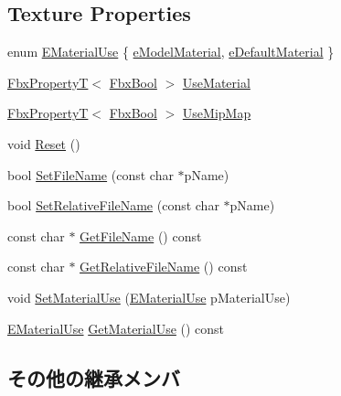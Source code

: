 \subsection*{Texture Properties}
\begin{DoxyCompactItemize}
\item 
enum \hyperlink{class_fbx_file_texture_ae85eb429015d450d8cb8a753634c0d1e}{E\+Material\+Use} \{ \hyperlink{class_fbx_file_texture_ae85eb429015d450d8cb8a753634c0d1ea0819de314e6f6458e1bc017c536e0821}{e\+Model\+Material}, 
\hyperlink{class_fbx_file_texture_ae85eb429015d450d8cb8a753634c0d1ea494e44ff611551c1172d7c9783690caa}{e\+Default\+Material}
 \}
\item 
\hyperlink{class_fbx_property_t}{Fbx\+PropertyT}$<$ \hyperlink{fbxtypes_8h_a92e0562b2fe33e76a242f498b362262e}{Fbx\+Bool} $>$ \hyperlink{class_fbx_file_texture_a404cc00d81d3645071cb475b0b822c59}{Use\+Material}
\item 
\hyperlink{class_fbx_property_t}{Fbx\+PropertyT}$<$ \hyperlink{fbxtypes_8h_a92e0562b2fe33e76a242f498b362262e}{Fbx\+Bool} $>$ \hyperlink{class_fbx_file_texture_ab7dd18dfbaf20ce668f5443ac7b5d2ec}{Use\+Mip\+Map}
\item 
void \hyperlink{class_fbx_file_texture_acc5d7a39640e4f7f0923c1620c473cb6}{Reset} ()
\item 
bool \hyperlink{class_fbx_file_texture_a82e450fd46559fc4c78ca6f0d593b837}{Set\+File\+Name} (const char $\ast$p\+Name)
\item 
bool \hyperlink{class_fbx_file_texture_a460992bc85c4087da594b60da1f2c6f5}{Set\+Relative\+File\+Name} (const char $\ast$p\+Name)
\item 
const char $\ast$ \hyperlink{class_fbx_file_texture_ae8b7a59e5d2787e9ca1aa4f3f1d2c7cf}{Get\+File\+Name} () const
\item 
const char $\ast$ \hyperlink{class_fbx_file_texture_a66dda210b8186cedba3d7543ce77a363}{Get\+Relative\+File\+Name} () const
\item 
void \hyperlink{class_fbx_file_texture_a8902fda7fce4a7329086aa0de5fdc49a}{Set\+Material\+Use} (\hyperlink{class_fbx_file_texture_ae85eb429015d450d8cb8a753634c0d1e}{E\+Material\+Use} p\+Material\+Use)
\item 
\hyperlink{class_fbx_file_texture_ae85eb429015d450d8cb8a753634c0d1e}{E\+Material\+Use} \hyperlink{class_fbx_file_texture_a5eee84efb4b82ad7270ac95a7ca9a5ca}{Get\+Material\+Use} () const
\end{DoxyCompactItemize}
\subsection*{その他の継承メンバ}


